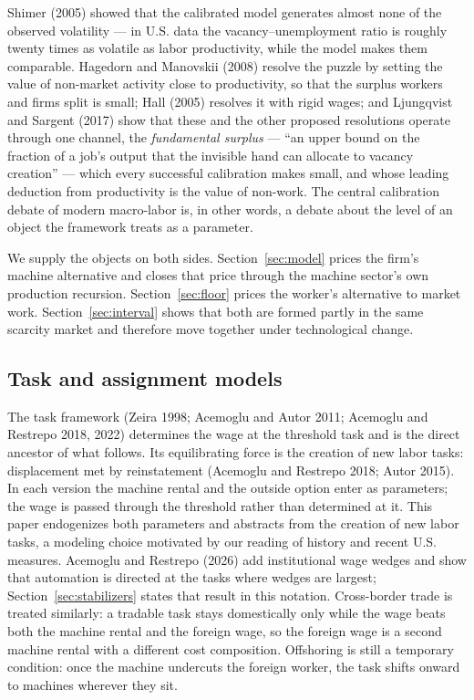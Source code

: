 \documentclass[12pt]{article}
\theoremstyle{plain}
\begin{document}
Shimer (2005) showed that the calibrated model generates almost none of the observed volatility --- in U.S. data the vacancy--unemployment ratio is roughly twenty times as volatile as labor productivity, while the model makes them comparable. Hagedorn and Manovskii (2008) resolve the puzzle by setting the value of non-market activity close to productivity, so that the surplus workers and firms split is small; Hall (2005) resolves it with rigid wages; and Ljungqvist and Sargent (2017) show that these and the other proposed resolutions operate through one channel, the \emph{fundamental surplus} --- ``an upper bound on the fraction of a job's output that the invisible hand can allocate to vacancy creation'' --- which every successful calibration makes small, and whose leading deduction from productivity is the value of non-work. The central calibration debate of modern macro-labor is, in other words, a debate about the level of an object the framework treats as a parameter.

We supply the objects on both sides. Section~\ref{sec:model} prices the firm's
machine alternative and closes that price through the machine sector's own
production recursion. Section~\ref{sec:floor} prices the worker's alternative
to market work. Section~\ref{sec:interval} shows that both are formed partly in
the same scarcity market and therefore move together under technological change.

\subsection{Task and assignment models}\label{sec:tasks}

The task framework (Zeira 1998; Acemoglu and Autor 2011; Acemoglu and Restrepo 2018, 2022) determines the wage at the threshold task and is the direct ancestor of what follows. Its equilibrating force is the creation of new labor tasks: displacement met by reinstatement (Acemoglu and Restrepo 2018; Autor 2015). In each version the machine rental and the outside option enter as parameters; the wage is passed through the threshold rather than determined at it. This paper endogenizes both parameters and abstracts from the creation of new labor tasks, a modeling choice motivated by our reading of history and recent U.S. measures. Acemoglu and Restrepo (2026) add institutional wage wedges and show that automation is directed at the tasks where wedges are largest; Section~\ref{sec:stabilizers} states that result in this notation. Cross-border trade is treated similarly: a tradable task stays domestically only while the wage beats both the machine rental and the foreign wage, so the foreign wage is a second machine rental with a different cost composition. Offshoring is still a temporary condition: once the machine undercuts the foreign worker, the task shifts onward to machines wherever they sit.
\end{document}
